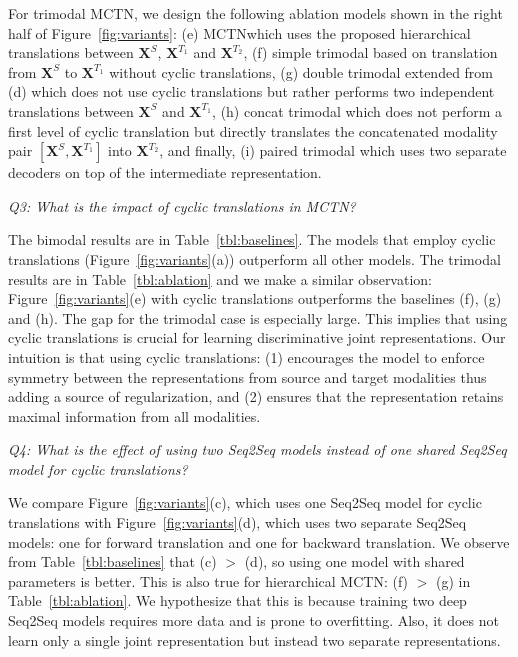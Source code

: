 \documentclass[letterpaper]{article} %
\newcommand{\ours}{MCTN}
\begin{document}
For trimodal \ours, we design the following ablation models shown in the right half of Figure~\ref{fig:variants}: (e) \ours \trimodal which uses the proposed hierarchical translations between $\mathbf{X}^S$, $\mathbf{X}^{T_1}$ and $\mathbf{X}^{T_2}$, (f) simple trimodal based on translation from $\mathbf{X}^S$ to $\mathbf{X}^{T_1}$ without cyclic translations, (g) double trimodal extended from (d) which does not use cyclic translations but rather performs two independent translations between $\mathbf{X}^S$ and $\mathbf{X}^{T_1}$, (h) concat trimodal which does not perform a first level of cyclic translation but directly translates the concatenated modality pair $[\mathbf{X}^S, \mathbf{X}^{T_1}]$ into $\mathbf{X}^{T_2}$, and finally, (i) paired trimodal which uses two separate decoders on top of the intermediate representation.

\textit{Q3: What is the impact of cyclic translations in \ours?}

The bimodal results are in Table~\ref{tbl:baselines}. The models that employ cyclic translations (Figure~\ref{fig:variants}(a)) outperform all other models. The trimodal results are in Table~\ref{tbl:ablation} and we make a similar observation: Figure~\ref{fig:variants}(e) with cyclic translations outperforms the baselines (f), (g) and (h). The gap for the trimodal case is especially large. This implies that using cyclic translations is crucial for learning discriminative joint representations. Our intuition is that using cyclic translations: (1) encourages the model to enforce symmetry between the representations from source and target modalities thus adding a source of regularization, and (2) ensures that the representation retains maximal information from all modalities.






\textit{Q4: What is the effect of using two Seq2Seq models instead of one shared Seq2Seq model for cyclic translations?}

We compare Figure~\ref{fig:variants}(c), which uses one Seq2Seq model for cyclic translations with Figure~\ref{fig:variants}(d), which uses two separate Seq2Seq models: one for forward translation and one for backward translation. We observe from Table~\ref{tbl:baselines} that (c) $>$ (d), so using one model with shared parameters is better. This is also true for hierarchical \ours: (f) $>$ (g) in Table~\ref{tbl:ablation}. We hypothesize that this is because training two deep Seq2Seq models requires more data and is prone to overfitting. 
Also, it does not learn only a single joint representation but instead two separate representations. 
\end{document}
